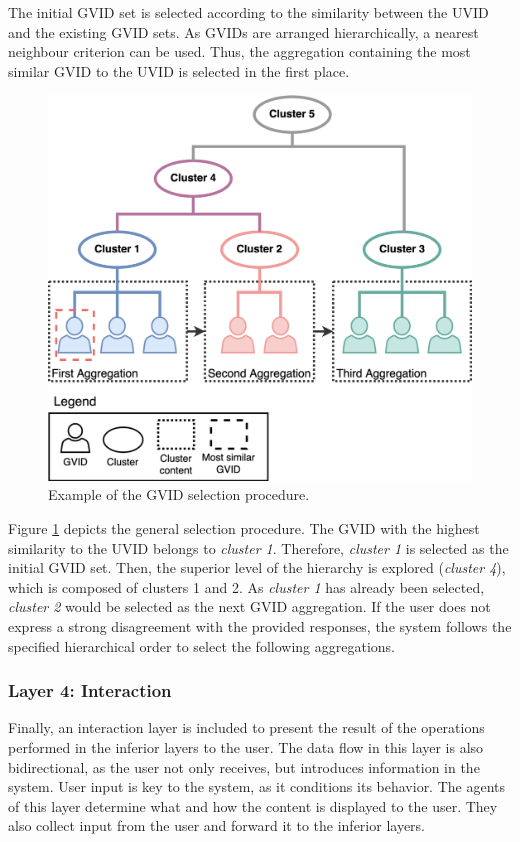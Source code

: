\begin{itemize}
    The initial GVID set is selected according to the similarity between the UVID and the existing GVID sets. As GVIDs are arranged hierarchically, a nearest neighbour criterion can be used. Thus, the aggregation containing the most similar GVID to the UVID is selected in the first place.

    \begin{figure}[t]
        \centering
        \includegraphics[width=.65\linewidth]{6_kbsextractiondl/figures/GVID_clusters.eps}
        \caption{Example of the GVID selection procedure.}
        \label{fig:gvid_selection}
    \end{figure}
    
    Figure \ref{fig:gvid_selection} depicts the general selection procedure. The GVID with the highest similarity to the UVID belongs to \textit{cluster 1}. Therefore, \textit{cluster 1} is selected as the initial GVID set. Then, the superior level of the hierarchy is explored (\textit{cluster 4}), which is composed of clusters 1 and 2. As \textit{cluster 1} has already been selected, \textit{cluster 2} would be selected as the next GVID aggregation. If the user does not express a strong disagreement with the provided responses, the system follows the specified hierarchical order to select the following aggregations.
\end{itemize}

\subsubsection*{Layer 4: Interaction}
Finally, an interaction layer is included to present the result of the operations performed in the inferior layers to the user. The data flow in this layer is also bidirectional, as the user not only receives, but introduces information in the system. User input is key to the system, as it conditions its behavior. The agents of this layer determine what and how the content is displayed to the user. They also collect input from the user and forward it to the inferior layers.

